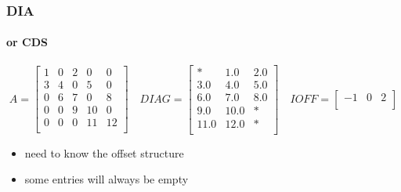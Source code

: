 \documentclass[10pt]{beamer}
\begin{document}
\begin{frame}
\frametitle{DIA}
\framesubtitle{or CDS}
\begin{equation*}
A=
\begin{bmatrix}
1 & 0 & 2 & 0 & 0\\
3 & 4 & 0 & 5 & 0\\
0 & 6 & 7 & 0 & 8\\
0 & 0 & 9 & 10 & 0\\
0 & 0 & 0 & 11 & 12\\
\end{bmatrix}
\quad
DIAG =
\begin{bmatrix}
  * & 1.0 & 2.0\\
3.0 & 4.0 & 5.0\\
6.0 & 7.0 & 8.0\\
9.0 & 10.0 & * \\
11.0 & 12.0 & *\\
\end{bmatrix}
\quad
IOFF=
\begin{bmatrix}
  -1 & 0 & 2\\
\end{bmatrix}
\end{equation*}
  \begin{itemize}
    \item need to know the offset structure
    \item some entries will always be empty
  \end{itemize}
\end{frame}
\end{document}
